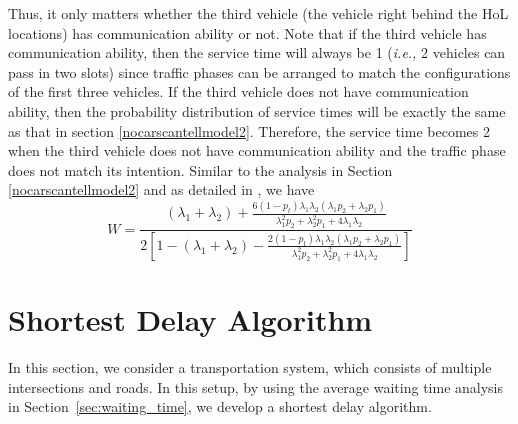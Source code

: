 \documentclass[conference]{IEEEtran}
\newcommand{\ie}{{\em i.e., }}
\begin{document}
Thus, it only matters whether the third vehicle (the vehicle right behind the HoL locations) has communication ability or not. Note that if the third vehicle has communication ability, then the service time will always be 1 (\ie 2 vehicles can pass in two slots) since traffic phases can be arranged to match the configurations of the first three vehicles. If the third vehicle does not have communication ability, then the probability distribution of service times will be exactly the same as that in section \ref{nocarscantellmodel2}. Therefore, the service time becomes 2 when the third vehicle does not have communication ability and the traffic phase does not match its intention. Similar to the analysis in Section \ref{nocarscantellmodel2} and as detailed in \cite{this_tech}, we have
\begin{equation}\label{waitingtime_model2}
W=\frac{(\lambda_1+\lambda_2)+\frac{6(1-p_t)\lambda_1\lambda_2(\lambda_1p_2+\lambda_2p_1)}{\lambda_1^2p_2+\lambda_2^2p_1+4\lambda_1\lambda_2}}{2\left[1-(\lambda_1+\lambda_2)-\frac{2(1-p_t)\lambda_1\lambda_2(\lambda_1p_2+\lambda_2p_1)}{\lambda_1^2p_2+\lambda_2^2p_1+4\lambda_1\lambda_2}\right]}
\end{equation} 




\vspace{-5pt}
\section{Shortest Delay Algorithm}\label{sec:algorithm}
In this section, we consider a transportation system, which consists of multiple intersections and roads. In this setup, by using the average waiting time analysis in Section~\ref{sec:waiting_time}, we develop a shortest delay algorithm.
\end{document}
